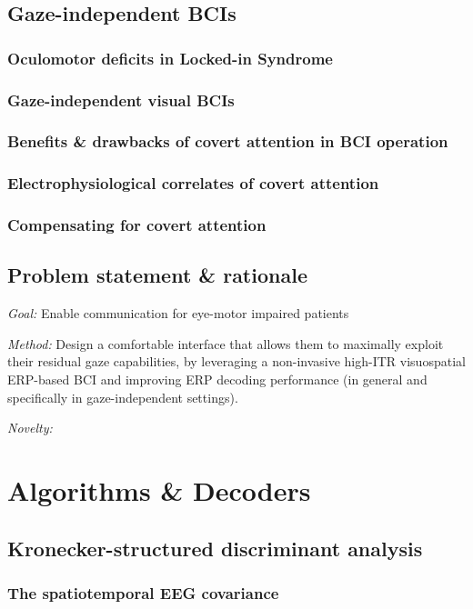 \documentclass[draft]{book}
\begin{document}
\chapter{Gaze-independent BCIs}
\section{Oculomotor deficits in Locked-in Syndrome}
\section{Gaze-independent visual BCIs}
\section{Benefits \& drawbacks of covert attention in BCI operation}
\section{Electrophysiological correlates of covert attention}
\section{Compensating for covert attention}

\chapter{Problem statement \& rationale}
\emph{Goal:} Enable communication for eye-motor impaired patients

\emph{Method:} Design a comfortable interface that allows them to maximally exploit
their residual gaze capabilities, by leveraging a non-invasive high-ITR
visuospatial ERP-based BCI and improving ERP decoding performance (in general
and specifically in gaze-independent settings).

\emph{Novelty:}


\part{Algorithms \& Decoders}

\chapter{Kronecker-structured discriminant analysis}
\section{The spatiotemporal EEG covariance}
\end{document}
